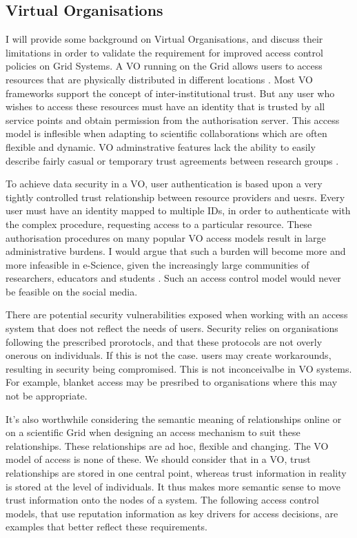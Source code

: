 \subsection{Virtual Organisations}
I will provide some background on Virtual Organisations, and discuss their limitations in order to validate the requirement for improved access control policies on Grid Systems. A VO running on the Grid allows users to access resources that are physically distributed in different locations \cite{}. Most VO frameworks support the concept of inter-institutional trust. But any user who wishes to access these resources must have an identity that is trusted by all service points and obtain permission from the authorisation server. This access model is inflesible when adapting to scientific collaborations which are often flexible and dynamic. VO adminstrative features lack the ability to easily describe fairly casual or temporary trust agreements between research groups \cite{}.

To achieve data security in a VO, user authentication is based upon a very tightly controlled trust relationship between resource providers and uesrs. Every user must have an identity mapped to multiple IDs, in order to authenticate with the complex procedure, requesting access to a particular resource. These authorisation procedures on many popular VO access models result in large administrative burdens. I would argue that such a burden will become more and more infeasible in e-Science, given the increasingly large communities of researchers, educators and students \cite{}. Such an access control model would never be feasible on the social media. 

There are potential security vulnerabilities exposed when working with an access system that does not reflect the needs of users. Security relies on organisations following the prescribed prorotocls, and that these protocols are not overly onerous on individuals. If this is not the case. users may create workarounds, resulting in security being compromised. This is not inconceivalbe in VO systems. For example, blanket access may be presribed to organisations where this may not be appropriate. 

It's also worthwhile considering the semantic meaning of relationships online or on a scientific Grid when designing an access mechanism to suit these relationships. These relationships are ad hoc, flexible and changing. The VO model of access is none of these. We should consider that in a VO, trust relationships are stored in one central point, whereas trust information in reality is stored at the level of individuals. It thus makes more semantic sense to move trust information onto the nodes of a system. The following access control models, that use reputation information as key drivers for access decisions, are examples that better reflect these requirements.

